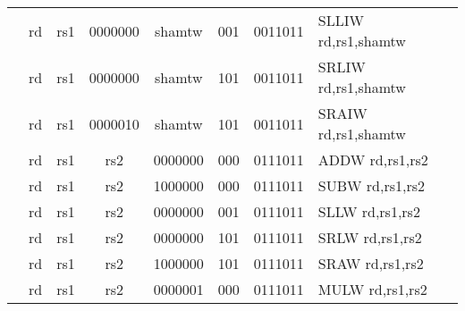 \begin{table}[p]
\begin{small}
\begin{center}
\begin{tabular}{rccccccccccl}
&
\multicolumn{1}{|c|}{rd} &
\multicolumn{1}{c|}{rs1} &
\multicolumn{3}{c|}{0000000} &
\multicolumn{2}{c|}{shamtw} &
\multicolumn{2}{c|}{001} &
\multicolumn{1}{c|}{0011011} & SLLIW rd,rs1,shamtw \\
\cline{2-11}
  

&
\multicolumn{1}{|c|}{rd} &
\multicolumn{1}{c|}{rs1} &
\multicolumn{3}{c|}{0000000} &
\multicolumn{2}{c|}{shamtw} &
\multicolumn{2}{c|}{101} &
\multicolumn{1}{c|}{0011011} & SRLIW rd,rs1,shamtw \\
\cline{2-11}
  

&
\multicolumn{1}{|c|}{rd} &
\multicolumn{1}{c|}{rs1} &
\multicolumn{3}{c|}{0000010} &
\multicolumn{2}{c|}{shamtw} &
\multicolumn{2}{c|}{101} &
\multicolumn{1}{c|}{0011011} & SRAIW rd,rs1,shamtw \\
\cline{2-11}
  

&
\multicolumn{1}{|c|}{rd} &
\multicolumn{1}{c|}{rs1} &
\multicolumn{1}{c|}{rs2} &
\multicolumn{4}{c|}{0000000} &
\multicolumn{2}{c|}{000} &
\multicolumn{1}{c|}{0111011} & ADDW rd,rs1,rs2 \\
\cline{2-11}
  

&
\multicolumn{1}{|c|}{rd} &
\multicolumn{1}{c|}{rs1} &
\multicolumn{1}{c|}{rs2} &
\multicolumn{4}{c|}{1000000} &
\multicolumn{2}{c|}{000} &
\multicolumn{1}{c|}{0111011} & SUBW rd,rs1,rs2 \\
\cline{2-11}
  

&
\multicolumn{1}{|c|}{rd} &
\multicolumn{1}{c|}{rs1} &
\multicolumn{1}{c|}{rs2} &
\multicolumn{4}{c|}{0000000} &
\multicolumn{2}{c|}{001} &
\multicolumn{1}{c|}{0111011} & SLLW rd,rs1,rs2 \\
\cline{2-11}
  

&
\multicolumn{1}{|c|}{rd} &
\multicolumn{1}{c|}{rs1} &
\multicolumn{1}{c|}{rs2} &
\multicolumn{4}{c|}{0000000} &
\multicolumn{2}{c|}{101} &
\multicolumn{1}{c|}{0111011} & SRLW rd,rs1,rs2 \\
\cline{2-11}
  

&
\multicolumn{1}{|c|}{rd} &
\multicolumn{1}{c|}{rs1} &
\multicolumn{1}{c|}{rs2} &
\multicolumn{4}{c|}{1000000} &
\multicolumn{2}{c|}{101} &
\multicolumn{1}{c|}{0111011} & SRAW rd,rs1,rs2 \\
\cline{2-11}
  

&
\multicolumn{1}{|c|}{rd} &
\multicolumn{1}{c|}{rs1} &
\multicolumn{1}{c|}{rs2} &
\multicolumn{4}{c|}{0000001} &
\multicolumn{2}{c|}{000} &
\multicolumn{1}{c|}{0111011} & MULW rd,rs1,rs2 \\
\cline{2-11}
  


\end{tabular}
\end{center}
\end{small}
\end{table}
